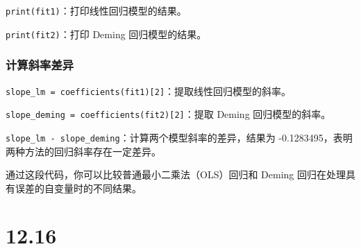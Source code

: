 \documentclass[UTF8]{report}
\theoremstyle{MyLineTheoremStyle} %
\theoremstyle{MyBlockTheoremStyle} %
\theoremstyle{MySubsubsectionStyle} %
\begin{document}
\texttt{print(fit1)}：打印线性回归模型的结果。

\texttt{print(fit2)}：打印 Deming 回归模型的结果。

\subsection*{计算斜率差异}

\texttt{slope\_lm = coefficients(fit1)[2]}：提取线性回归模型的斜率。

\texttt{slope\_deming = coefficients(fit2)[2]}：提取 Deming 回归模型的斜率。

\texttt{slope\_lm - slope\_deming}：计算两个模型斜率的差异，结果为 -0.1283495，表明两种方法的回归斜率存在一定差异。

通过这段代码，你可以比较普通最小二乘法（OLS）回归和 Deming 回归在处理具有误差的自变量时的不同结果。



\chapter{12.16}
\end{document}
